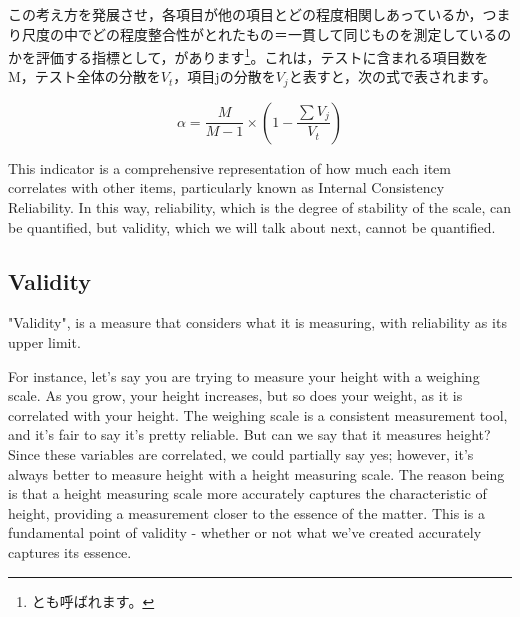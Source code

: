 \documentclass{ltjsbook}
\begin{document}
この考え方を発展させ，各項目が他の項目とどの程度相関しあっているか，つまり尺度の中でどの程度整合性がとれたもの＝一貫して同じものを測定しているのかを評価する指標として，があります\footnote{とも呼ばれます。}。これは，テストに含まれる項目数をM，テスト全体の分散を$V_t$，項目jの分散を$V_j$と表すと，次の式で表されます。

\[  \alpha =   \frac{M}{M-1} \times \left(1-\frac{\sum V_j}{V_t} \right) \]

This indicator is a comprehensive representation of how much each item correlates with other items, particularly known as Internal Consistency Reliability.
In this way, reliability, which is the degree of stability of the scale, can be quantified, but validity, which we will talk about next, cannot be quantified.
\subsection{Validity}
"Validity", is a measure that considers what it is measuring, with reliability as its upper limit.

For instance, let's say you are trying to measure your height with a weighing scale. As you grow, your height increases, but so does your weight, as it is correlated with your height. The weighing scale is a consistent measurement tool, and it's fair to say it's pretty reliable. But can we say that it measures height? Since these variables are correlated, we could partially say yes; however, it's always better to measure height with a height measuring scale. The reason being is that a height measuring scale more accurately captures the characteristic of height, providing a measurement closer to the essence of the matter. This is a fundamental point of validity - whether or not what we've created accurately captures its essence.
\end{document}
